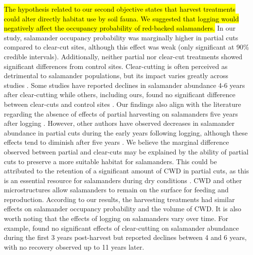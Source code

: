 \hl{The hypothesis related to our second objective states that harvest treatments could alter directly habitat use by soil fauna. 
We suggested that logging would negatively affect the occupancy probability of red-backed salamanders. }
In our study, salamander occupancy probability was marginally higher in partial cuts compared to clear-cut sites, although this effect was weak (only significant at 90\% credible intervals). 
Additionally, neither partial nor clear-cut treatments showed significant differences from control sites. 
Clear-cutting is often perceived as detrimental to salamander populations, but its impact varies greatly across studies \citep{Hocking2013Effectsexperimental,Chaudhary2016Impactforest}. 
Some studies have reported declines in salamander abundance 4-6 years after clear-cutting \citep{Petranka1993Effectstimber,Herbeck1999PlethodontidSalamander,Grialou2000effectsforest,Macneil2014Effectstimber}  
while others, including ours, found no significant difference between clear-cuts and control sites \citep{Renken2004EffectsForest,Mazerolle2021Woodlandsalamander}. 
Our findings also align with the literature regarding the absence of effects of partial harvesting on salamanders five years after logging \citep{McKenny2006Effectsstructural,Mazerolle2021Woodlandsalamander,Ochs2022Responseterrestrial}. 
However, other authors have observed decreases in salamander abundance in partial cuts during the early years following logging, although these effects tend to diminish after five years \citep{Harpole1999Effectsseven,Knapp2003Initialeffects,Morneault2004effectshelterwood}.  
We believe the marginal difference observed between partial and clear-cuts may be explained by the ability of partial cuts to preserve a more suitable habitat for salamanders. 
This could be attributed to the retention of a significant amount of CWD in partial cuts, as this is an essential resource for salamanders during dry conditions \citep{Nolet2018Comparingeffects,Peterman2014Spatialvariation,Achat2015Quantifyingconsequences,Peele2017Effectswoody}.  
CWD and other microstructures allow salamanders to remain on the surface for feeding and reproduction. 
According to our results, the harvesting treatments had similar effects on salamander occupancy probability and the volume of CWD. 
It is also worth noting that the effects of logging on salamanders vary over time. 
For example, \cite{Ochs2022Responseterrestrial} found no significant effects of clear-cutting on salamander abundance during the first 3 years post-harvest but reported declines between 4 and 6 years, with no recovery observed up to 11 years later. 

